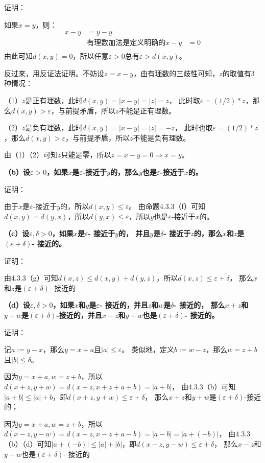 \documentclass{article}
\theoremstyle{mystyle}
\begin{document}
证明：

如果$x=y$，则：
\begin{align*}
  x-y & = y-y \\ &\text{有理数加法是定义明确的}
  x-y & = 0   \\
\end{align*}
由此可知$d(x,y)=0$，所以任意$\varepsilon > 0$总有$\varepsilon > d(x,y)$。

反过来，用反证法证明。不妨设$z=x-y$，由有理数的三歧性可知，$z$的取值有3种情况：

（1）$z$是正有理数，此时$d(x,y)=|x-y|=|z|=z$，
此时取$\varepsilon = (1/2) * z$，那么$d(x,y) > \varepsilon$，与前提矛盾，所以$z$不能是正有理数。

（2）$z$是负有理数，此时$d(x,y)=|x-y|=|z|=-z$，
此时也取$\varepsilon = (1/2) * z$，那么$d(x,y) > \varepsilon$，与前提矛盾，所以$z$不能是负有理数。

由（1）（2）可知$z$只能是零，所以$z=x-y=0 \Rightarrow x=y$。

\textbf{（b）设$\varepsilon > 0$，如果$x$是$\varepsilon$-接近于$y$的，那么$y$也是$\varepsilon$-接近于$x$的。}

证明：

由于$x$是$\varepsilon$-接近于$y$的，所以$d(x,y) \leq \varepsilon$。
由命题4.3.3（f）可知$d(x,y)=d(y,x)$，所以$d(y,x) \leq \varepsilon$，所以$y$也是$\varepsilon$-接近于$x$的。

\textbf{（c）设$\varepsilon,\delta>0$，如果$x$是$\varepsilon$- 接近于$y$的，
  并且$y$是$\delta$- 接近于$z$的，那么$x$和$z$是$(\varepsilon+\delta)$- 接近的。}

证明：

由4.3.3（g）可知$d(x,z) \leq d(x,y) + d(y,z)$，所以$d(x,z) \leq \varepsilon + \delta$，
那么$x$和$z$是$(\varepsilon+\delta)$- 接近的

\textbf{（d）设$\varepsilon,\delta>0$，如果$x$和$y$是$\varepsilon$- 接近的，并且$z$和$w$是$\delta$- 接近的，
  那么$x+z$和$y+w$是$(\varepsilon+\delta)$-接近的，并且$x-z$和$y-w$也是$(\varepsilon+\delta)$- 接近的。}

证明：

记$a:=y-x$，那么$y=x+a$且$|a| \leq \varepsilon$。
类似地，定义$b:=w-z$，那么$w=z+b$且$|b| \leq \delta$。

因为$y=x+a,w=z+b$，所以$d(x+z,y+w)=d(x+z,x+z+a+b)=|a+b|$，
由4.3.3（b）可知$|a+b| \leq |a|+b$，即$d(x+z,y+w) \leq \varepsilon + \delta$，
那么$x+z$和$y+w$是$(\varepsilon+\delta)$-接近的；

因为$y=x+a,w=z+b$，所以$d(x-z,y-w)=d(x-z,x-z+a-b)=|a-b|=|a+(-b)|$，
由4.3.3（b）（d）可知$|a+(-b)| \leq |a| + |b|$，即$d(x-z,y-w) \leq \varepsilon + \delta$，
那么$x-z$和$y-w$也是$(\varepsilon+\delta)$- 接近的
\end{document}
